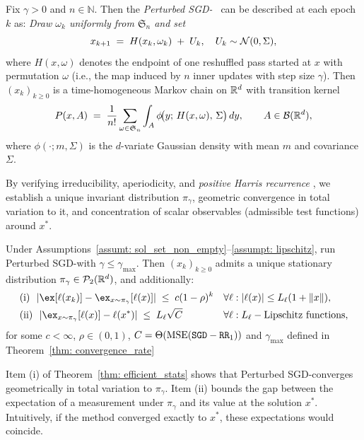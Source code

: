 \begin{lemma}\label{lem:epoch-homog}
Fix $\gamma>0$ and $n\in\mathbb{N}$. Then the \emph{Perturbed SGD-\RRresh\ } can be described at each epoch $k$ as:
\emph{Draw $\omega_k$ uniformly from $\mathfrak{S}_n$ and set}
\[\vspace{-0.25em}
x_{k+1}
\;=\;
H(x_k,\omega_k)\;+\;U_k, 
\quad U_k\sim \mathcal N(0,\Sigma),
\vspace{-0.25em}\]
where $H(x,\omega)$ denotes the endpoint of one reshuffled pass started at $x$ with permutation $\omega$ (i.e., the map induced by $n$ inner updates with step size $\gamma$). Then $(x_k)_{k\ge 0}$ is a time-homogeneous Markov chain on $\mathbb{R}^d$ with transition kernel
\[
P(x,A)
\;=\;
\frac{1}{n!}\sum_{\omega\in\mathfrak{S}_n}
\int_A \phi\!\big(y;\,H(x,\omega),\,\Sigma \big)\,dy,
\qquad A\in\mathcal{B}(\mathbb{R}^d),
\]
where $\phi(\cdot;m,\Sigma )$ is the $d$-variate Gaussian density with mean $m$ and covariance $\Sigma$.
\end{lemma}
\vspace{-0.5em}
By verifying irreducibility, aperiodicity, and \emph{positive Harris recurrence} \citep{meyn2012markov}, we establish a unique invariant distribution $\pi_\gamma$, geometric convergence in total variation to it, and concentration of scalar observables (admissible test functions) around $x^*$.
\begin{theorem}\label{thm: efficient_stats}
Under Assumptions~\ref{assumt: sol_set_non_empty}--\ref{assumpt: lipschitz}, run Perturbed SGD-\RRresh with $\gamma\le\gamma_{\max}$. Then $(x_k)_{k\ge0}$ admits a unique stationary distribution $\pi_\gamma\in\mathcal P_2(\mathbb{R}^d)$, and additionally:
\begin{align*}
&\text{(i)}~~ |\ex[\ell(x_k)]-\ex_{x\sim\pi_\gamma}[\ell(x)]|\;\le\;c(1-\rho)^k 
&& \forall \ell:|\ell(x)|\le L_\ell(1+\|x\|), \\
&\text{(ii)}~~ |\ex_{x\sim\pi_\gamma}[\ell(x)]-\ell(x^*)|\;\le\;L_\ell\sqrt{C} 
&& \forall \ell:  L_\ell-\text{Lipschitz functions},
\end{align*}
for some $c<\infty$, $\rho\in(0,1)$, $C=\Theta(\mathrm{MSE}(\texttt{SGD}-{\texttt{RR}\textsubscript{1}}))$ and $\gamma_{\max}$ defined in Theorem~\ref{thm: convergence_rate}%
\end{theorem}
\begin{draftremark}
Item (i) of Theorem~\ref{thm: efficient_stats} shows that Perturbed SGD-\RRresh converges geometrically in total variation to $\pi_\gamma$.
Item (ii) bounds the gap between the expectation of a measurement under $\pi_\gamma$ and its value at the solution $x^*$. Intuitively, if the method converged exactly to $x^*$, these expectations would coincide.
\end{draftremark}
